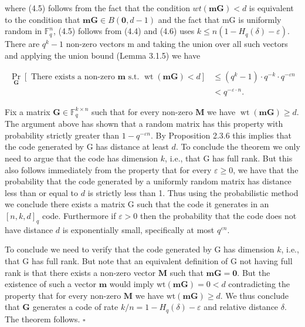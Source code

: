 \documentclass[10pt]{article}
\begin{document}
where (4.5) follows from the fact that the condition $w t(\mathbf{m G})<d$ is equivalent to the condition that $\mathbf{m G} \in B(\mathbf{0}, d-1)$ and the fact that mG is uniformly random in $\mathbb{F}_{q}^{n}$, (4.5) follows from (4.4) and (4.6) uses $k \leq n\left(1-H_{q}(\delta)-\varepsilon\right)$. There are $q^{k}-1$ non-zero vectors m and taking the union over all such vectors and applying the union bound (Lemma 3.1.5) we have

$$
\begin{aligned}
\underset{\mathbf{G}}{\operatorname{Pr}}[\text { There exists a non-zero } \mathbf{m} \text { s.t. } \operatorname{wt}(\mathbf{m G})<d] & \leq\left(q^{k}-1\right) \cdot q^{-k} \cdot q^{-\varepsilon n} \\
& <q^{-\varepsilon \cdot n} .
\end{aligned}
$$

Fix a matrix $\mathbf{G} \in \mathbb{F}_{q}^{k \times n}$ such that for every non-zero $\mathbf{M}$ we have $\operatorname{wt}(\mathbf{m G}) \geq d$. The argument above has shown that a random matrix has this property with probability strictly greater than $1-q^{-\varepsilon n}$. By Proposition 2.3.6 this implies that the code generated by G has distance at least $d$. To conclude the theorem we only need to argue that the code has dimension $k$, i.e., that G has full rank. But this also follows immediately from the property that for every $\varepsilon \geq 0$, we have that the probability that the code generated by a uniformly random matrix has distance less than or equal to $d$ is strictly less than 1. Thus using the probabilistic method we conclude there exists a matrix G such that the code it generates in an $[n, k, d]_{q}$ code. Furthermore if $\varepsilon>0$ then the probability that the code does not have distance $d$ is exponentially small, specifically at most $q^{\varepsilon n}$.

To conclude we need to verify that the code generated by G has dimension $k$, i.e., that G has full rank. But note that an equivalent definition of G not having full rank is that there exists a non-zero vector $\mathbf{M}$ such that $\mathbf{m G}=\mathbf{0}$. But the existence of such a vector $\mathbf{m}$ would imply $\mathrm{wt}(\mathbf{m G})=0<d$ contradicting the property that for every non-zero $\mathbf{M}$ we have $\mathrm{wt}(\mathbf{m G}) \geq d$. We thus conclude that $\mathbf{G}$ generates a code of rate $k / n=1-H_{q}(\delta)-\varepsilon$ and relative distance $\delta$. The theorem follows. \(\square\)
\end{document}
